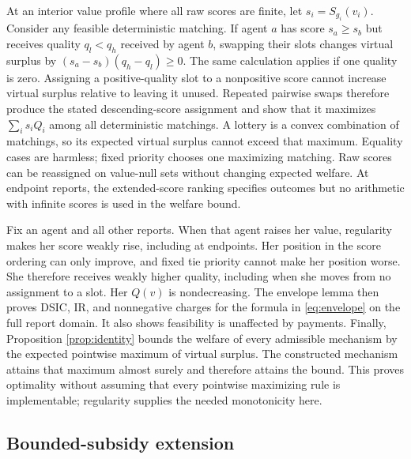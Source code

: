 \documentclass[11pt]{article}
\begin{document}
At an interior value profile where all raw scores are finite, let $s_i=S_{g_i}(v_i)$. Consider any feasible deterministic matching. If agent $a$ has score $s_a\ge s_b$ but receives quality $q_l<q_h$ received by agent $b$, swapping their slots changes virtual surplus by $(s_a-s_b)(q_h-q_l)\ge0$. The same calculation applies if one quality is zero. Assigning a positive-quality slot to a nonpositive score cannot increase virtual surplus relative to leaving it unused. Repeated pairwise swaps therefore produce the stated descending-score assignment and show that it maximizes $\sum_i s_iQ_i$ among all deterministic matchings. A lottery is a convex combination of matchings, so its expected virtual surplus cannot exceed that maximum. Equality cases are harmless; fixed priority chooses one maximizing matching. Raw scores can be reassigned on value-null sets without changing expected welfare. At endpoint reports, the extended-score ranking specifies outcomes but no arithmetic with infinite scores is used in the welfare bound.

Fix an agent and all other reports. When that agent raises her value, regularity makes her score weakly rise, including at endpoints. Her position in the score ordering can only improve, and fixed tie priority cannot make her position worse. She therefore receives weakly higher quality, including when she moves from no assignment to a slot. Her $Q(v)$ is nondecreasing. The envelope lemma then proves DSIC, IR, and nonnegative charges for the formula in \eqref{eq:envelope} on the full report domain. It also shows feasibility is unaffected by payments. Finally, Proposition \ref{prop:identity} bounds the welfare of every admissible mechanism by the expected pointwise maximum of virtual surplus. The constructed mechanism attains that maximum almost surely and therefore attains the bound. This proves optimality without assuming that every pointwise maximizing rule is implementable; regularity supplies the needed monotonicity here.

\subsection{Bounded-subsidy extension}\label{app:subsidy}
\end{document}
